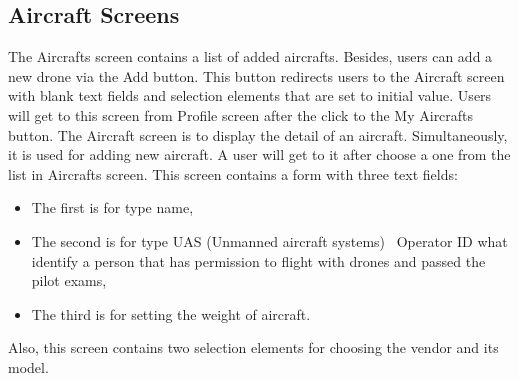 \subsection{Aircraft Screens}\label{subsec:aircraft-screens}
The Aircrafts screen contains a list of added aircrafts.
Besides, users can add a new drone via the Add button.
This button redirects users to the Aircraft screen with blank text fields and selection elements that are set to initial value.
Users will get to this screen from Profile screen after the click to the My Aircrafts button.
\newpage
The Aircraft screen is to display the detail of an aircraft.
Simultaneously, it is used for adding new aircraft.
A user will get to it after choose a one from the list in Aircrafts screen.
This screen contains a form with three text fields:
\begin{itemize}
    \item The first is for type name,
    \item The second is for type UAS (Unmanned aircraft systems)~\cite{uas} Operator ID what identify a person that has permission to flight with drones and passed the pilot exams,
    \item The third is for setting the weight of aircraft.
\end{itemize}
Also, this screen contains two selection elements for choosing the vendor and its model.
